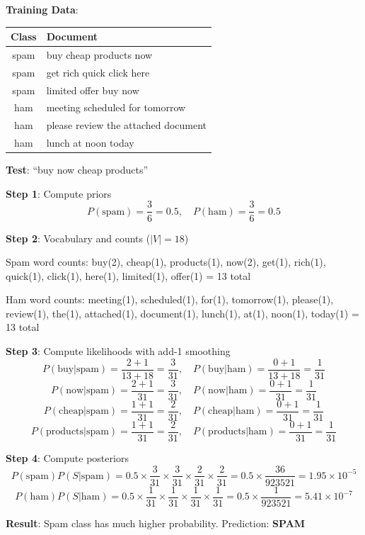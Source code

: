 \documentclass[11pt,a4paper]{article}
\begin{document}
\begin{tcolorbox}[colback=green!5!white,colframe=green!75!black,title=\textbf{Worked Example 19: Naive Bayes for Spam Detection}]
\textbf{Training Data}:
\begin{center}
\begin{tabular}{|c|l|}
\hline
\textbf{Class} & \textbf{Document} \\ \hline
spam & buy cheap products now \\ \hline
spam & get rich quick click here \\ \hline
spam & limited offer buy now \\ \hline
ham & meeting scheduled for tomorrow \\ \hline
ham & please review the attached document \\ \hline
ham & lunch at noon today \\ \hline
\end{tabular}
\end{center}

\textbf{Test}: ``buy now cheap products''

\textbf{Step 1}: Compute priors
\[
P(\text{spam}) = \frac{3}{6} = 0.5, \quad P(\text{ham}) = \frac{3}{6} = 0.5
\]

\textbf{Step 2}: Vocabulary and counts ($|V| = 18$)

Spam word counts: buy(2), cheap(1), products(1), now(2), get(1), rich(1), quick(1), click(1), here(1), limited(1), offer(1) = 13 total

Ham word counts: meeting(1), scheduled(1), for(1), tomorrow(1), please(1), review(1), the(1), attached(1), document(1), lunch(1), at(1), noon(1), today(1) = 13 total

\textbf{Step 3}: Compute likelihoods with add-1 smoothing
\[
P(\text{buy}|\text{spam}) = \frac{2+1}{13+18} = \frac{3}{31}, \quad
P(\text{buy}|\text{ham}) = \frac{0+1}{13+18} = \frac{1}{31}
\]
\[
P(\text{now}|\text{spam}) = \frac{2+1}{31} = \frac{3}{31}, \quad
P(\text{now}|\text{ham}) = \frac{0+1}{31} = \frac{1}{31}
\]
\[
P(\text{cheap}|\text{spam}) = \frac{1+1}{31} = \frac{2}{31}, \quad
P(\text{cheap}|\text{ham}) = \frac{0+1}{31} = \frac{1}{31}
\]
\[
P(\text{products}|\text{spam}) = \frac{1+1}{31} = \frac{2}{31}, \quad
P(\text{products}|\text{ham}) = \frac{0+1}{31} = \frac{1}{31}
\]

\textbf{Step 4}: Compute posteriors
\[
P(\text{spam})P(S|\text{spam}) = 0.5 \times \frac{3}{31} \times \frac{3}{31} \times \frac{2}{31} \times \frac{2}{31} = 0.5 \times \frac{36}{923521} = 1.95 \times 10^{-5}
\]
\[
P(\text{ham})P(S|\text{ham}) = 0.5 \times \frac{1}{31} \times \frac{1}{31} \times \frac{1}{31} \times \frac{1}{31} = 0.5 \times \frac{1}{923521} = 5.41 \times 10^{-7}
\]

\textbf{Result}: Spam class has much higher probability. Prediction: \textbf{SPAM}
\end{tcolorbox}
\end{document}
